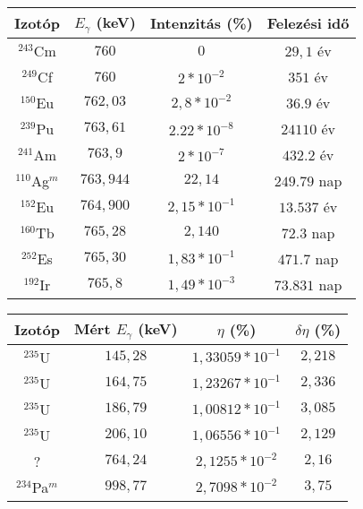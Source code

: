 \begin{center}
\begin{tabular}{|c|c|c|c|}
\hline
Izotóp 			 & $E_{\gamma}$ (keV) & Intenzitás (\%) & Felezési idő \\
\hline
$^{243}$Cm       & $760$     & $0$              & $29,1$ év    \\
$^{249}$Cf       & $760$     & $2 * 10^{-2}$    & $351$ év     \\
$^{150}$Eu       & $762,03$  & $2,8 * 10^{-2}$  & $36.9$ év    \\
$^{239}$Pu       & $763,61$  & $2.22 * 10^{-8}$ & $24110$ év   \\
$^{241}$Am       & $763,9$   & $2 * 10^{-7}$    & $432.2$ év   \\
$^{110}$Ag$^{m}$ & $763,944$ & $22,14$          & $249.79$ nap \\
$^{152}$Eu       & $764,900$ & $2,15 * 10^{-1}$ & $	13.537$ év \\
$^{160}$Tb       & $765,28$  & $2,140$          & $72.3$ nap   \\
$^{252}$Es       & $765,30$  & $1,83 * 10^{-1}$ & $471.7$ nap  \\
$^{192}$Ir       & $765,8$   & $1,49 * 10^{-3}$ & $73.831$ nap \\
\hline
\end{tabular}
 \label{table:2}
\end{center}

\begin{center}
\begin{tabular}{|c|c|c|c|}
\hline
Izotóp 			 & Mért $E_{\gamma}$ (keV) & $\eta$ (\%)          & $\delta \eta$ (\%) \\
\hline
$^{235}$U 		 & $145,28$                & $1,33059 * 10^{-1}$  & $2,218$            \\
$^{235}$U 		 & $164,75$ 	           & $1,23267 * 10^{-1}$  & $2,336$            \\
$^{235}$U 		 & $186,79$ 	           & $1,00812 * 10^{-1}$  & $3,085$            \\
$^{235}$U        & $206,10$ 	           & $1,06556 * 10^{-1}$  & $2,129$            \\
?                & $764,24$ 	           & $2,1255 * 10^{-2}$   & $2,16$             \\
$^{234}$Pa$^{m}$ & $998,77$ 	           & $2,7098 * 10^{-2}$   & $3,75$             \\
\hline
\end{tabular}
 \label{table:3}
\end{center}

